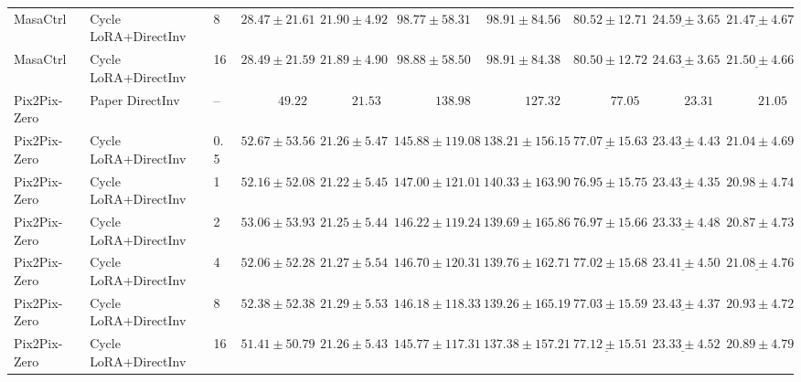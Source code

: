 \documentclass{article}
\begin{document}
\begin{table}[htbp]
{\begin{tabular}{lllrrrrrrr}
    MasaCtrl & Cycle LoRA+DirectInv & 8 & $\mathit{28.47 \pm 21.61}$ & $21.90 \pm 4.92$ & $\mathit{98.77 \pm 58.31}$ & $98.91 \pm 84.56$ & $\mathit{80.52 \pm 12.71}$ & $\underline{24.59 \pm 3.65}$ & $\underline{21.47 \pm 4.67}$ \tabularnewline
    MasaCtrl & Cycle LoRA+DirectInv & 16 & $28.49 \pm 21.59$ & $21.89 \pm 4.90$ & $98.88 \pm 58.50$ & $\mathit{98.91 \pm 84.38}$ & $80.50 \pm 12.72$ & $\underline{\mathbf{\mathit{24.63 \pm 3.65}}}$ & $\underline{21.50 \pm 4.66}$ \tabularnewline
    \midrule
    Pix2Pix-Zero & Paper DirectInv & -- & $\mathbf{49.22}$ & $\mathbf{21.53}$ & $\mathbf{138.98}$ & $\mathbf{127.32}$ & $77.05$ & $23.31$ & $21.05$ \tabularnewline
    Pix2Pix-Zero & Cycle LoRA+DirectInv & 0.5 & $52.67 \pm 53.56$ & $21.26 \pm 5.47$ & $145.88 \pm 119.08$ & $138.21 \pm 156.15$ & $\underline{77.07 \pm 15.63}$ & $\underline{\mathbf{\mathit{23.43 \pm 4.43}}}$ & $21.04 \pm 4.69$ \tabularnewline
    \rowcolor{cyclebaseline} Pix2Pix-Zero & Cycle LoRA+DirectInv & 1 & $52.16 \pm 52.08$ & $21.22 \pm 5.45$ & $147.00 \pm 121.01$ & $140.33 \pm 163.90$ & $76.95 \pm 15.75$ & $\underline{23.43 \pm 4.35}$ & $20.98 \pm 4.74$ \tabularnewline
    Pix2Pix-Zero & Cycle LoRA+DirectInv & 2 & $53.06 \pm 53.93$ & $21.25 \pm 5.44$ & $146.22 \pm 119.24$ & $139.69 \pm 165.86$ & $76.97 \pm 15.66$ & $\underline{23.33 \pm 4.48}$ & $20.87 \pm 4.73$ \tabularnewline
    Pix2Pix-Zero & Cycle LoRA+DirectInv & 4 & $52.06 \pm 52.28$ & $21.27 \pm 5.54$ & $146.70 \pm 120.31$ & $139.76 \pm 162.71$ & $77.02 \pm 15.68$ & $\underline{23.41 \pm 4.50}$ & $\underline{\mathbf{\mathit{21.08 \pm 4.76}}}$ \tabularnewline
    Pix2Pix-Zero & Cycle LoRA+DirectInv & 8 & $52.38 \pm 52.38$ & $\mathit{21.29 \pm 5.53}$ & $146.18 \pm 118.33$ & $139.26 \pm 165.19$ & $77.03 \pm 15.59$ & $\underline{23.43 \pm 4.37}$ & $20.93 \pm 4.72$ \tabularnewline
    Pix2Pix-Zero & Cycle LoRA+DirectInv & 16 & $\mathit{51.41 \pm 50.79}$ & $21.26 \pm 5.43$ & $\mathit{145.77 \pm 117.31}$ & $\mathit{137.38 \pm 157.21}$ & $\underline{\mathbf{\mathit{77.12 \pm 15.51}}}$ & $\underline{23.33 \pm 4.52}$ & $20.89 \pm 4.79$ \tabularnewline
    \bottomrule
  \end{tabular}%
  }
\end{table}
\end{document}
